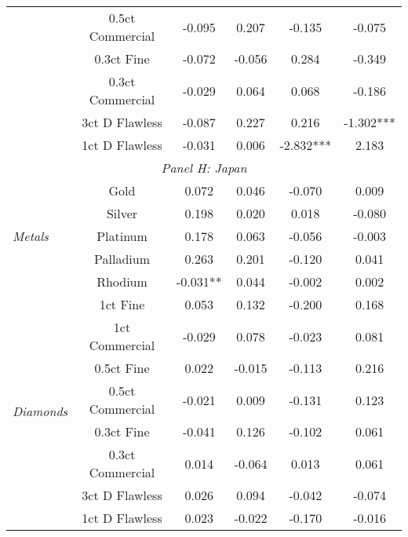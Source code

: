 \begin{tabularx}{1\textwidth}{Xccccc}
								& 0.5ct Commercial & -0.095 & 0.207 & -0.135 & -0.075 \\
								& 0.3ct Fine & -0.072 & -0.056 & 0.284 & -0.349 \\
								& 0.3ct Commercial & -0.029 & 0.064 & 0.068 & -0.186 \\
								& 3ct D Flawless & -0.087 & 0.227 & 0.216 & -1.302*** \\
								& 1ct D Flawless & -0.031 & 0.006 & -2.832*** & 2.183 \\
\midrule
\multicolumn{6}{c}{\emph{Panel H: Japan}} \\
\multirow{5}{*}{\emph{Metals}} & Gold & 0.072 & 0.046 & -0.070 & 0.009 \\
								& Silver & 0.198 & 0.020 & 0.018 & -0.080 \\
								& Platinum & 0.178 & 0.063 & -0.056 & -0.003 \\
								& Palladium & 0.263 & 0.201 & -0.120 & 0.041 \\
								& Rhodium & -0.031** & 0.044 & -0.002 & 0.002 \\
\midrule
\multirow{8}{*}{\emph{Diamonds}} & 1ct Fine & 0.053 & 0.132 & -0.200 & 0.168 \\
								& 1ct Commercial & -0.029 & 0.078 & -0.023 & 0.081 \\
								& 0.5ct Fine & 0.022 & -0.015 & -0.113 & 0.216 \\
								& 0.5ct Commercial & -0.021 & 0.009 & -0.131 & 0.123 \\
								& 0.3ct Fine & -0.041 & 0.126 & -0.102 & 0.061 \\
								& 0.3ct Commercial & 0.014 & -0.064 & 0.013 & 0.061 \\
								& 3ct D Flawless & 0.026 & 0.094 & -0.042 & -0.074  \\
								& 1ct D Flawless & 0.023 & -0.022 & -0.170 & -0.016 \\

\bottomrule
\end{tabularx}
